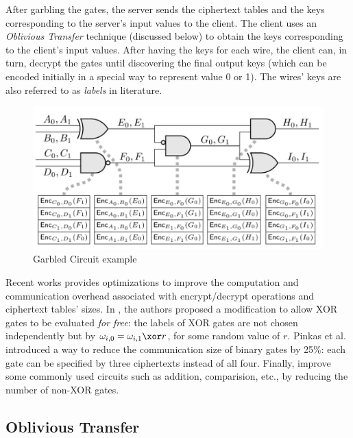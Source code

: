 After garbling the gates, the server sends the ciphertext tables and the keys corresponding to the server's input values to the client. The client uses an
\textit{Oblivious Transfer } technique (discussed below) to obtain the keys
corresponding to the client's input values. After having the keys for each wire,
the client can, in turn, decrypt the gates until discovering the final output keys
(which can be encoded initially in a special way to represent value 0 or 1). The
wires' keys are also referred to as \textit{labels} in literature.

\begin{figure}[htbp!] 
  \centering    
  \includegraphics[width=1.0\textwidth]{Chapter2/Figs/Raster/garbledCircuit}
  \caption{Garbled Circuit example}
  \label{fig:garbledCircuit}
\end{figure}

Recent works provides optimizations to improve the computation and communication
overhead associated with encrypt/decrypt operations and ciphertext tables'
sizes. In \cite{kolesnikov2008improved30}, the authors proposed a modification to
allow XOR gates to be evaluated \textit{for free}: the labels of XOR gates are
not chosen independently but by \(\omega_{i,0} = \omega_{i,1} \xor r\), for some
random value of \(r\). Pinkas et al. \cite{pinkas2009secure38} introduced a way to reduce the communication size of binary gates by 25\%: each gate can be specified by three ciphertexts instead of all four. Finally, \cite{kolesnikov2009improved29} improve some commonly used circuits such as addition, comparision, etc., by reducing the number of non-XOR gates.

\subsection{Oblivious Transfer}
\label{sec:obliviousTransferPre}

